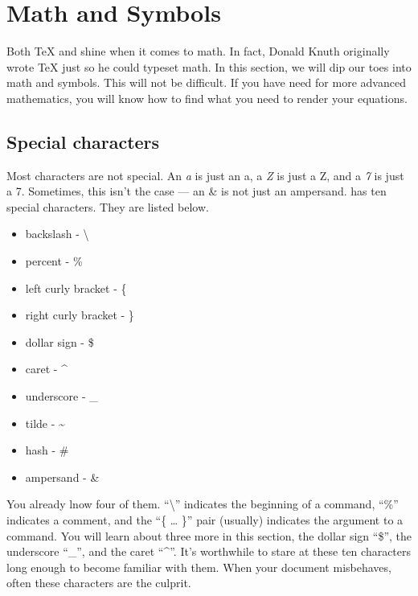     \section{Math and Symbols}
    \label{Math}

	Both \TeX{} and \Lx{} shine when it comes to math. In fact, Donald Knuth originally wrote \TeX{} just so he could typeset math. In this section, we will dip our toes into math and symbols. This will not be difficult. If you have need for more advanced mathematics, you will know how to find what you need to render your equations.

        \subsection{Special characters}
        \label{Special-characters}
        
		Most characters are not special. An \textit{a} is just an a, a \textit{Z} is just a Z, and a \textit{7} is just a 7. Sometimes, this isn't the case --- an \&  is not just an ampersand. \Lx{} has ten special characters. They are listed below.

        \begin{cmd}
            \begin{itemize}
                \item backslash - \textbackslash
                \item  percent - \%
                \item  left curly bracket - \{
                \item  right curly bracket - \}
                \item  dollar sign - \$
                \item  caret - \^{} 
                \item  underscore - \_
                \item  tilde - \~{} 
                \item  hash - \#
                \item  ampersand - \&
                \index{\textbackslash}
                \index{\%}
                \index{\{\}}
                \index{\$}
                \index{\^{}}
                \index{\_}
                \index{\#}
                \index{\&}
            \end{itemize}
        \end{cmd}

        You already lnow four of them. ``\textbackslash'' indicates the beginning of a command, ``\%'' indicates a comment, and the ``\{ \ldots{} \}'' pair (usually) indicates the argument to a command. You will learn about three more in this section, the dollar sign ``\$'', the underscore ``\_'', and the caret ``\^{}''. It's worthwhile to stare at these ten characters long enough to become familiar with them. When your document misbehaves, often these characters are the culprit.

